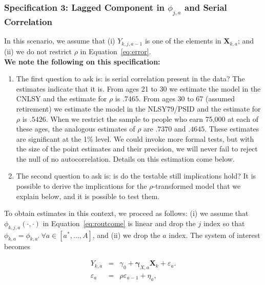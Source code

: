 \subsubsection{Specification 3: Lagged Component in $\phi_{j,a}$ and Serial Correlation} \label{section:laggedserial}

\noindent In this scenario, we assume that (i)  $Y_{k,j,a-1}$ is one of the elements in $\bm{X}_{k,a}$; and (ii) we do not restrict $\rho$ in Equation~\eqref{eq:error}.\\

\noindent \textbf{We note the following on this specification:}

\begin{enumerate}

\item The first question to ask is: is serial correlation present in the data? The estimates indicate that it is. From ages 21 to 30 we estimate the model in the CNLSY and the estimate for $\rho$ is $.7465$. From ages 30 to 67 (assumed retirement) we estimate the model in the NLSY79/PSID and the estimate for $\rho$ is $.5426$. When we restrict the sample to people who earn 75,000 at each of these ages, the analogous estimates of $\rho$ are $.7370$ and $.4645$. These estimates are significant at the 1\% level. We could invoke more formal tests, but with the size of the point estimates and their precision, we will never fail to reject the null of no autocorrelation. Details on this estimation come below.\\

\item The second question to ask is: is do the testable still implications hold?  It is possible to derive the implications for the $\rho$-transformed model that we explain below, and it is possible to test them.
\end{enumerate}

\noindent To obtain estimates in this context, we proceed as follows: (i) we assume that $\phi_{k,j,a} \left( \cdot, \cdot \right)$ in Equation~\eqref{eq:routcome} is linear and drop the $j$ index so that $\phi_{k,a} = \phi_{k,a'} \ \forall a \in [a^*, \ldots, A]$, and (ii) we drop the $a$ index. The system of interest becomes

\begin{eqnarray}
Y_{k,a} &=&\gamma_{0} + \bm{\gamma}_{X,a} \bm{X}_{k} + \varepsilon_{a}. \label{eq:linear1} \\
\varepsilon_{a} &=& \rho \varepsilon_{a-1} + \eta_{a}, \label{eq:linear2}
\end{eqnarray}

